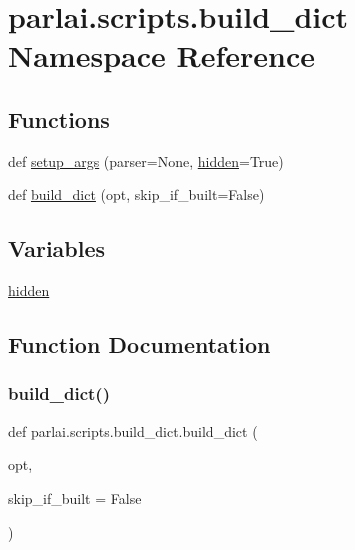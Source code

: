 \hypertarget{namespaceparlai_1_1scripts_1_1build__dict}{}\section{parlai.\+scripts.\+build\+\_\+dict Namespace Reference}
\label{namespaceparlai_1_1scripts_1_1build__dict}
\subsection*{Functions}
\begin{DoxyCompactItemize}
\item 
def \hyperlink{namespaceparlai_1_1scripts_1_1build__dict_a01e78707ace903aa772ada53fafe7067}{setup\+\_\+args} (parser=None, \hyperlink{namespaceparlai_1_1scripts_1_1build__dict_ab1670dd829e6129c8e3da84dd474da60}{hidden}=True)
\item 
def \hyperlink{namespaceparlai_1_1scripts_1_1build__dict_a3a0381817d7188331ee38b4a4627dbe0}{build\+\_\+dict} (opt, skip\+\_\+if\+\_\+built=False)
\end{DoxyCompactItemize}
\subsection*{Variables}
\begin{DoxyCompactItemize}
\item 
\hyperlink{namespaceparlai_1_1scripts_1_1build__dict_ab1670dd829e6129c8e3da84dd474da60}{hidden}
\end{DoxyCompactItemize}


\subsection{Function Documentation}
\mbox{\label{namespaceparlai_1_1scripts_1_1build__dict_a3a0381817d7188331ee38b4a4627dbe0}} 
\subsubsection{\texorpdfstring{build\+\_\+dict()}{build\_dict()}}
{\footnotesize\ttfamily def parlai.\+scripts.\+build\+\_\+dict.\+build\+\_\+dict (\begin{DoxyParamCaption}\item[{}]{opt,  }\item[{}]{skip\+\_\+if\+\_\+built = {\ttfamily False} }\end{DoxyParamCaption})}




